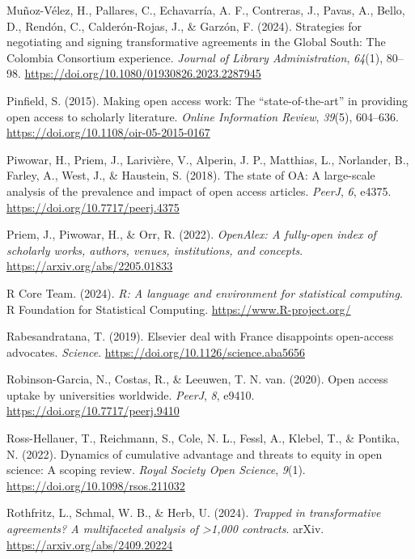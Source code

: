\documentclass[a4paper,man,floatsintext,longtable,noextraspace,10pt]{apa6}
\newlength{\cslhangindent}
\newenvironment{CSLReferences}[2] %
{\begin{list}{}{%
  \setlength{\itemindent}{0pt}
  \setlength{\leftmargin}{0pt}
  \setlength{\parsep}{0pt}
  \ifodd #1
  \setlength{\leftmargin}{\cslhangindent}
  \setlength{\itemindent}{-1\cslhangindent}
  \fi
  \setlength{\itemsep}{#2\baselineskip}}}
{\end{list}}
\begin{document}
\begin{CSLReferences}{1}{0}
Muñoz-Vélez, H., Pallares, C., Echavarría, A. F., Contreras, J., Pavas,
A., Bello, D., Rendón, C., Calderón-Rojas, J., \& Garzón, F. (2024).
Strategies for negotiating and signing transformative agreements in the
{Global South}: The {Colombia Consortium} experience. \emph{Journal of
Library Administration}, \emph{64}(1), 80--98.
\url{https://doi.org/10.1080/01930826.2023.2287945}

Pinfield, S. (2015). Making open access work: The {``state-of-the-art''}
in providing open access to scholarly literature. \emph{Online
Information Review}, \emph{39}(5), 604--636.
\url{https://doi.org/10.1108/oir-05-2015-0167}

Piwowar, H., Priem, J., Larivière, V., Alperin, J. P., Matthias, L.,
Norlander, B., Farley, A., West, J., \& Haustein, S. (2018). The state
of {OA}: A large-scale analysis of the prevalence and impact of open
access articles. \emph{{PeerJ}}, \emph{6}, e4375.
\url{https://doi.org/10.7717/peerj.4375}

Priem, J., Piwowar, H., \& Orr, R. (2022). \emph{OpenAlex: A fully-open
index of scholarly works, authors, venues, institutions, and concepts}.
\url{https://arxiv.org/abs/2205.01833}

R Core Team. (2024). \emph{R: A language and environment for statistical
computing}. R Foundation for Statistical Computing.
\url{https://www.R-project.org/}

Rabesandratana, T. (2019). Elsevier deal with {France} disappoints
open-access advocates. \emph{Science}.
\url{https://doi.org/10.1126/science.aba5656}

Robinson-Garcia, N., Costas, R., \& Leeuwen, T. N. van. (2020). Open
access uptake by universities worldwide. \emph{{PeerJ}}, \emph{8},
e9410. \url{https://doi.org/10.7717/peerj.9410}

Ross-Hellauer, T., Reichmann, S., Cole, N. L., Fessl, A., Klebel, T., \&
Pontika, N. (2022). Dynamics of cumulative advantage and threats to
equity in open science: A scoping review. \emph{Royal Society Open
Science}, \emph{9}(1). \url{https://doi.org/10.1098/rsos.211032}

Rothfritz, L., Schmal, W. B., \& Herb, U. (2024). \emph{Trapped in
transformative agreements? A multifaceted analysis of \textgreater1,000
contracts}. arXiv. \url{https://arxiv.org/abs/2409.20224}


\end{CSLReferences}
\end{document}
